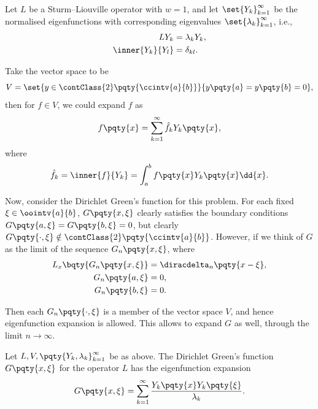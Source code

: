 Let \(L\) be a Sturm--Liouville operator with \(w = 1\), and let \(\set{Y_k}_{k = 1}^{\infty}\) be the normalised eigenfunctions with corresponding eigenvalues \(\set{\lambda_k}_{k = 1}^{\infty}\), i.e.,
\begin{subequations}
    \begin{align}
        L Y_k &= \lambda_k Y_k, \\
        \inner{Y_k}{Y_l} &= \delta_{kl}.
    \end{align}
\end{subequations}

Take the vector space to be
\begin{equation}
    V = \set{y \in \contClass{2}\pqty{\ccintv{a}{b}}}{y\pqty{a} = y\pqty{b} = 0},
\end{equation}
then for \(f \in V\), we could expand \(f\) as
\begin{equation}
    f\pqty{x} = \sum_{k = 1}^{\infty} \hat{f}_k Y_k\pqty{x},
\end{equation}
where
\begin{equation}
    \hat{f}_k = \inner{f}{Y_k} = \int_{a}^{b} f\pqty{x} Y_k\pqty{x} \dd{x}.
\end{equation}

Now, consider the Dirichlet Green's function for this problem. For each fixed \(\xi \in \oointv{a}{b}\), \(G\pqty{x, \xi}\) clearly satisfies the boundary conditions \(G\pqty{a, \xi} = G\pqty{b, \xi} = 0\), but clearly \(G\pqty{\cdot, \xi} \notin \contClass{2} \pqty{\ccintv{a}{b}}\). However, if we think of \(G\) as the limit of the sequence \(G_n \pqty{x, \xi}\), where
\begin{subequations}
    \begin{align}
        L_x \bqty{G_n\pqty{x, \xi}} &= \diracdelta_n\pqty{x - \xi}, \\
        G_n \pqty{a, \xi} &= 0, \\
        G_n \pqty{b, \xi} &= 0.
    \end{align}
\end{subequations}

Then each \(G_n \pqty{\cdot, \xi}\) is a member of the vector space \(V\), and hence eigenfunction expansion is allowed. This allows to expand \(G\) as well, through the limit \(n \to \infty\).

\begin{proposition}
    Let \(L, V, \pqty{Y_k, \lambda_k}_{k = 1}^{\infty}\) be as above. The Dirichlet Green's function \(G\pqty{x, \xi}\) for the operator \(L\) has the eigenfunction expansion
    \begin{equation}
        G\pqty{x, \xi} = \sum_{k = 1}^{\infty} \frac{Y_k\pqty{x} Y_k\pqty{\xi}}{\lambda_k}.
    \end{equation}
\end{proposition}


